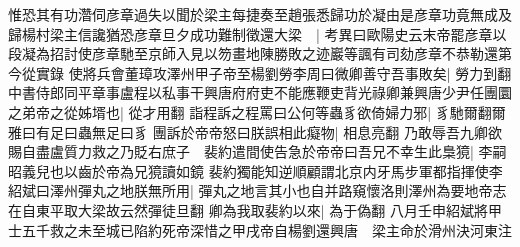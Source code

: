 惟恐其有功濳伺彦章過失以聞於梁主每捷奏至趙張悉歸功於凝由是彦章功竟無成及歸楊村梁主信讒猶恐彦章旦夕成功難制徵還大梁　|{
	考異曰歐陽史云末帝罷彦章以段凝為招討使彦章馳至京師入見以笏畫地陳勝敗之迹巖等諷有司劾彦章不恭勒還第今從實錄}
使將兵會董璋攻澤州甲子帝至楊劉勞李周曰微卿善守吾事敗矣|{
	勞力到翻}
中書侍郎同平章事盧程以私事干興唐府府吏不能應鞭吏背光祿卿兼興唐少尹任團圜之弟帝之從姊壻也|{
	從才用翻}
詣程訴之程罵曰公何等蟲豸欲倚婦力邪|{
	豸馳爾翻爾雅曰有足曰蟲無足曰豸}
團訴於帝帝怒曰朕誤相此癡物|{
	相息亮翻}
乃敢辱吾九卿欲賜自盡盧質力救之乃貶右庶子　裴約遣間使告急於帝帝曰吾兄不幸生此梟獍|{
	李嗣昭義兒也以齒於帝為兄獍讀如鏡}
裴約獨能知逆順顧謂北京内牙馬步軍都指揮使李紹斌曰澤州彈丸之地朕無所用|{
	彈丸之地言其小也自并路窺懷洛則澤州為要地帝志在自東平取大梁故云然彈徒旦翻}
卿為我取裴約以來|{
	為于偽翻}
八月壬申紹斌將甲士五千救之未至城已陷約死帝深惜之甲戌帝自楊劉還興唐　梁主命於滑州決河東注

